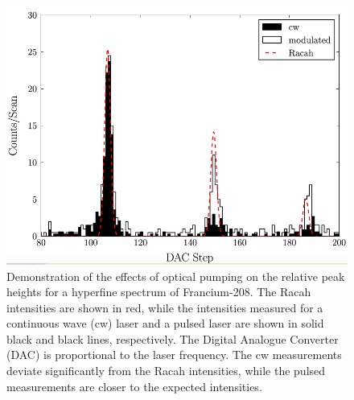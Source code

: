 \begin{figure}[h]
\includegraphics[width=\textwidth]{Graphics/francium.png}
\caption[Demonstration of the effects of optical pumping on the relative peak heights for a hyperfine spectrum of Francium-208.]{\small Demonstration of the effects of optical pumping on the relative peak heights for a hyperfine spectrum of Francium-208. The Racah intensities are shown in red, while the intensities measured for a continuous wave (cw) laser and a pulsed laser are shown in solid black and black lines, respectively. The Digital Analogue Converter (DAC) is proportional to the laser frequency. The cw measurements deviate significantly from the Racah intensities, while the pulsed measurements are closer to the expected intensities\cite{CFBS}.}
\label{OP_francium}
\end{figure}

